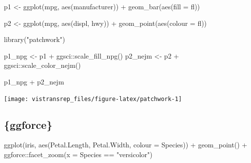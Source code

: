 \documentclass[]{book}
\newenvironment{Shaded}{}{}
\newcommand{\DataTypeTok}[1]{#1}
\newcommand{\KeywordTok}[1]{\textcolor[rgb]{0.00,0.00,1.00}{#1}}
\newcommand{\NormalTok}[1]{#1}
\newcommand{\OperatorTok}[1]{#1}
\newcommand{\StringTok}[1]{\textcolor[rgb]{0.00,0.50,0.50}{#1}}
\begin{document}
\begin{Shaded}
\begin{Highlighting}[]
\NormalTok{p1 <-}\StringTok{ }\KeywordTok{ggplot}\NormalTok{(mpg, }\KeywordTok{aes}\NormalTok{(manufacturer)) }\OperatorTok{+}
\StringTok{  }\KeywordTok{geom_bar}\NormalTok{(}\KeywordTok{aes}\NormalTok{(}\DataTypeTok{fill =}\NormalTok{ fl))}

\NormalTok{p2 <-}\StringTok{ }\KeywordTok{ggplot}\NormalTok{(mpg, }\KeywordTok{aes}\NormalTok{(displ, hwy)) }\OperatorTok{+}
\StringTok{  }\KeywordTok{geom_point}\NormalTok{(}\KeywordTok{aes}\NormalTok{(}\DataTypeTok{colour =}\NormalTok{ fl))}
\end{Highlighting}
\end{Shaded}

\begin{Shaded}
\begin{Highlighting}[]
\KeywordTok{library}\NormalTok{(}\StringTok{"patchwork"}\NormalTok{)}

\NormalTok{p1_npg <-}\StringTok{ }\NormalTok{p1 }\OperatorTok{+}\StringTok{ }\NormalTok{ggsci}\OperatorTok{::}\KeywordTok{scale_fill_npg}\NormalTok{()}
\NormalTok{p2_nejm <-}\StringTok{ }\NormalTok{p2 }\OperatorTok{+}\StringTok{ }\NormalTok{ggsci}\OperatorTok{::}\KeywordTok{scale_color_nejm}\NormalTok{()}

\NormalTok{p1_npg }\OperatorTok{+}\StringTok{ }\NormalTok{p2_nejm}
\end{Highlighting}
\end{Shaded}

\begin{flushright}\texttt{[image: vistransrep\_files/figure-latex/patchwork-1]} \end{flushright}

\hypertarget{ggforce}{%
\subsection{\{ggforce\}}\label{ggforce}}

\begin{Shaded}
\begin{Highlighting}[]
\KeywordTok{ggplot}\NormalTok{(iris, }\KeywordTok{aes}\NormalTok{(Petal.Length, Petal.Width, }\DataTypeTok{colour =}\NormalTok{ Species)) }\OperatorTok{+}
\StringTok{  }\KeywordTok{geom_point}\NormalTok{() }\OperatorTok{+}
\StringTok{  }\NormalTok{ggforce}\OperatorTok{::}\KeywordTok{facet_zoom}\NormalTok{(}\DataTypeTok{x =}\NormalTok{ Species }\OperatorTok{==}\StringTok{ "versicolor"}\NormalTok{)}
\end{Highlighting}
\end{Shaded}
\end{document}
